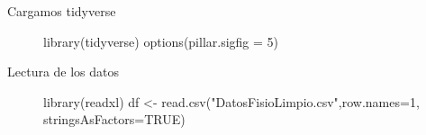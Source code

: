 \documentclass[
  ignorenonframetext,
]{beamer}
\newenvironment{Shaded}{\begin{snugshade}}{\end{snugshade}}
\newcommand{\AttributeTok}[1]{\textcolor[rgb]{0.40,0.45,0.13}{#1}}
\newcommand{\ConstantTok}[1]{\textcolor[rgb]{0.56,0.35,0.01}{#1}}
\newcommand{\DecValTok}[1]{\textcolor[rgb]{0.68,0.00,0.00}{#1}}
\newcommand{\FunctionTok}[1]{\textcolor[rgb]{0.28,0.35,0.67}{#1}}
\newcommand{\NormalTok}[1]{\textcolor[rgb]{0.00,0.23,0.31}{#1}}
\newcommand{\OtherTok}[1]{\textcolor[rgb]{0.00,0.23,0.31}{#1}}
\newcommand{\StringTok}[1]{\textcolor[rgb]{0.13,0.47,0.30}{#1}}
\newcommand*\circled[1]{\tikz[baseline=(char.base)]{
          \node[shape=circle,draw,inner sep=1pt] (char) {{\scriptsize#1}};}}
\begin{document}
\begin{frame}[fragile]{Cargamos tidyverse}
\label{cargamos-tidyverse}
\begin{figure}

\begin{Shaded}
\begin{Highlighting}[]
\FunctionTok{library}\NormalTok{(tidyverse) }
\FunctionTok{options}\NormalTok{(}\AttributeTok{pillar.sigfig =} \DecValTok{5}\NormalTok{) }
\end{Highlighting}
\end{Shaded}

\end{figure}%
\end{frame}

\begin{frame}[fragile]{Lectura de los datos}
\label{lectura-de-los-datos}
\begin{figure}

\label{annotated-cell-4}%
\begin{Shaded}
\begin{Highlighting}[]
\FunctionTok{library}\NormalTok{(readxl) }\hspace*{\fill}\NormalTok{\circled{1}}
\NormalTok{df }\OtherTok{\textless{}{-}} \FunctionTok{read.csv}\NormalTok{(}\StringTok{"DatosFisioLimpio.csv"}\NormalTok{,}\AttributeTok{row.names=}\DecValTok{1}\NormalTok{, }\AttributeTok{stringsAsFactors=}\ConstantTok{TRUE}\NormalTok{)}
\end{Highlighting}
\end{Shaded}

\end{figure}%
\end{frame}
\end{document}

